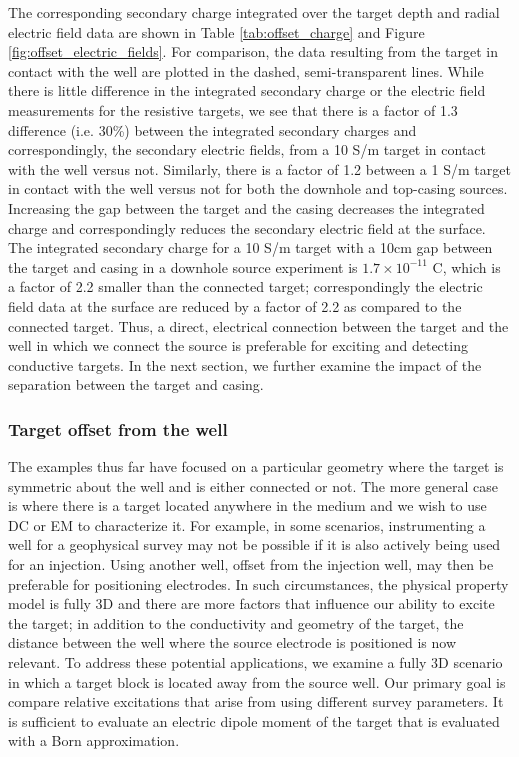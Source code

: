 

The corresponding secondary charge integrated over the target depth and radial electric field data are shown in Table \ref{tab:offset_charge} and Figure \ref{fig:offset_electric_fields}. For comparison, the data resulting from the target in contact with the well are plotted in the dashed, semi-transparent lines. While there is little difference in the integrated secondary charge or the electric field measurements for the resistive targets, we see that there is a factor of 1.3 difference (i.e. 30\%) between the integrated secondary charges and correspondingly, the secondary electric fields, from a 10 S/m target in contact with the well versus not. Similarly, there is a factor of 1.2 between a 1 S/m target in contact with the well versus not for both the downhole and top-casing sources. Increasing the gap between the target and the casing decreases the integrated charge and correspondingly reduces the secondary electric field at the surface. The integrated secondary charge for a 10 S/m target with a 10cm gap between the target and casing in a downhole source experiment is $1.7 \times 10^{-11}$ C, which is a factor of 2.2 smaller than the connected target; correspondingly the electric field data at the surface are reduced by a factor of 2.2 as compared to the connected target. Thus, a direct, electrical connection between the target and the well in which we connect the source is preferable for exciting and detecting conductive targets. In the next section, we further examine the impact of the separation between the target and casing.








\subsubsection{Target offset from the well}

The examples thus far have focused on a particular geometry where the target is symmetric about the well and is either connected or not. The more general case is where there is a target located anywhere in the medium and we wish to use DC or EM to characterize it. For example, in some scenarios, instrumenting a well for a geophysical survey may not be possible if it is also actively being used for an injection. Using another well, offset from the injection well, may then be preferable for positioning electrodes. In such circumstances, the physical property model is fully 3D and there are more factors that influence our ability to excite the target; in addition to the conductivity and geometry of the target, the distance between the well where the source electrode is positioned is now relevant. To address these potential applications, we examine a fully 3D scenario in which a target block is located away from the source well. Our primary goal is compare relative excitations that arise from using different survey parameters. It is sufficient to evaluate an electric dipole moment of the target that is evaluated with a Born approximation.

